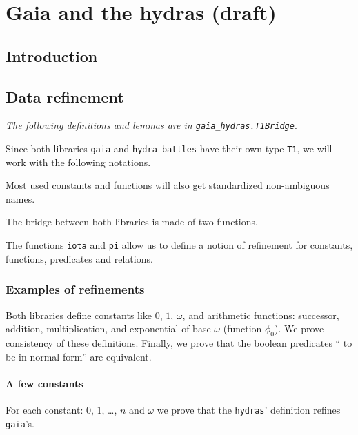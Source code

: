 \chapter{Gaia and the hydras (draft)}

\section{Introduction}


\section{Data refinement}

\emph{The following definitions and lemmas are in
\href{../theories/html/gaia_hydras.T1Bridge.html}%
{\texttt{gaia\_hydras.T1Bridge}}}.

Since both libraries \texttt{gaia} and \texttt{hydra-battles} have their own type \texttt{T1}, we will work with the following notations.


Most used constants and functions will also get standardized
non-ambiguous names.





The bridge between both libraries is made of two functions.



The functions \texttt{iota} and \texttt{pi} allow us to define
a notion of refinement for constants, functions, predicates and relations.


\subsection{Examples of refinements}
Both libraries define constants like $0$, $1$, $\omega$, and arithmetic functions: successor, addition, multiplication, and exponential of base $\omega$ (function $\phi_0$). We prove consistency of these definitions. Finally, we prove that the boolean predicates `` to be in normal form'' are equivalent.

\subsubsection{A few constants}
For each constant: $0$, $1$, \dots, $n$ and $\omega$ we prove
that the \texttt{hydras}' definition refines \texttt{gaia}'s.

